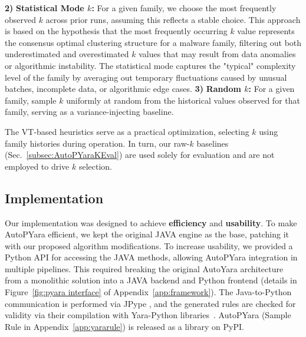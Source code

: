 \noindent \textbf{2)} \textbf{Statistical Mode $k$:} For a given family, we choose the most frequently observed $k$ across prior runs, assuming this reflects a stable choice. This approach is based on the hypothesis that the most frequently occurring $k$ value represents the consensus optimal clustering structure for a malware family, filtering out both underestimated and overestimated $k$ values that may result from data anomalies or algorithmic instability. The statistical mode captures the "typical" complexity level of the family by averaging out temporary fluctuations caused by unusual batches, incomplete data, or algorithmic edge cases. \newline
\noindent \textbf{3)} \textbf{Random $k$:} For a given family, sample $k$ uniformly at random from the historical values observed for that family, serving as a variance-injecting baseline.

The VT-based heuristics serve as a practical optimization, selecting $k$ using family histories during operation. In turn, our raw-$k$ baselines (Sec.~\ref{subsec:AutoPYaraKEval}) are used solely for evaluation and are not employed to drive $k$ selection.

\vspace{-2.0mm}
\subsection{Implementation}

\noindent Our implementation was designed to achieve \textbf{efficiency} and \textbf{usability}. To make AutoPYara efficient, we kept the original JAVA engine as the base, patching it with our proposed algorithm modifications. To increase usability, we provided a Python API for accessing the JAVA methods, allowing AutoPYara integration in multiple pipelines. This required breaking the original AutoYara architecture from a monolithic solution into a JAVA backend and Python frontend (details in Figure~\ref{fig:pyara interface} of Appendix~\ref{app:framework}). The Java-to-Python communication is performed via JPype \cite{jpype}, and the generated rules are checked for validity via their compilation with Yara-Python libraries~\cite{yaramod, yara_python}. AutoPYara (Sample Rule in Appendix~\ref{app:yararule}) is released as a library on PyPI.
